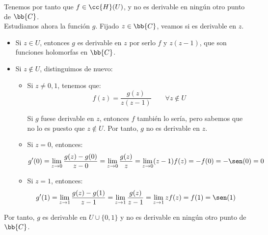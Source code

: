 \documentclass[12pt]{article}
\begin{document}
\begin{ejercicio}[3 puntos]
        Tenemos por tanto que $f\in \cc{H}(U)$, y no es derivable en ningún otro punto de $\bb{C}$.\\

        Estudiamos ahora la función $g$. Fijado $z\in \bb{C}$, veamos si es derivable en $z$.
        \begin{itemize}
            \item Si $z\in U$, entonces $g$ es derivable en $z$ por serlo $f$ y $z(z-1)$, que son funciones holomorfas en $\bb{C}$.
            \item Si $z\notin U$, distinguimos de nuevo:
            \begin{itemize}
                \item Si $z\neq 0,1$, tenemos que:
                \begin{equation*}
                    f(z) = \dfrac{g(z)}{z(z-1)}\qquad \forall z\notin U
                \end{equation*}

                Si $g$ fuese derivable en $z$, entonces $f$ también lo sería, pero sabemos que no lo es puesto que $z\notin U$. Por tanto, $g$ no es derivable en $z$.

                \item Si $z=0$, entonces:
                \begin{align*}
                    g'(0) &= \lim_{z\to 0} \frac{g(z)-g(0)}{z-0} = \lim_{z\to 0} \frac{g(z)}{z} = \lim_{z\to 0} (z-1)f(z) = -f(0) = -\sen(0) = 0
                \end{align*}

                \item Si $z=1$, entonces:
                \begin{align*}
                    g'(1) &= \lim_{z\to 1} \frac{g(z)-g(1)}{z-1} = \lim_{z\to 1} \frac{g(z)}{z-1} = \lim_{z\to 1} zf(z) = f(1) = \sen(1)
                \end{align*}
            \end{itemize}
        \end{itemize}

        Por tanto, $g$ es derivable en $U\cup \{0,1\}$ y no es derivable en ningún otro punto de $\bb{C}$.
    \end{ejercicio}
\end{document}
